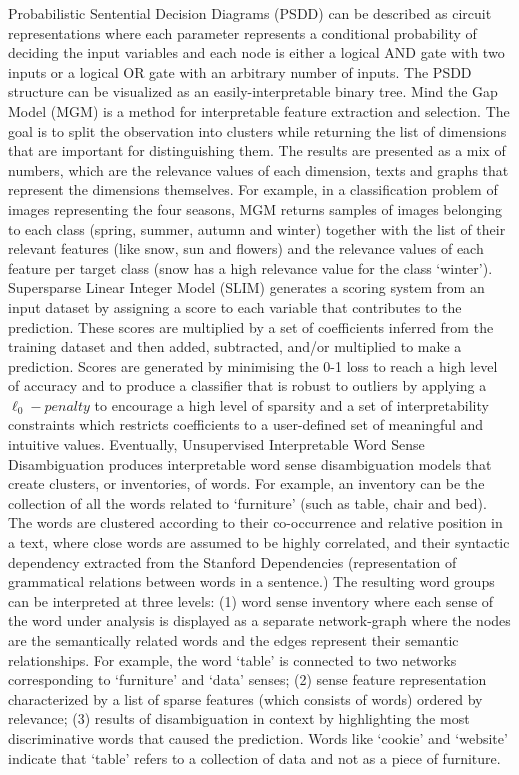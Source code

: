 \documentclass[final,1p,times]{elsarticle}
\begin{document}
Probabilistic Sentential Decision Diagrams (PSDD) \cite{liang2017towards} can be described as circuit representations where each parameter represents a conditional probability of deciding the input variables and each node is either a logical AND gate with two inputs or a logical OR gate with an arbitrary number of inputs. The PSDD structure can be visualized as an easily-interpretable binary tree.
Mind the Gap Model (MGM) \cite{kim2015mind} is a method for interpretable feature extraction and selection. The goal is to split the observation into clusters while returning the list of dimensions that are important for distinguishing them. The results are presented as a mix of numbers, which are the relevance values of each dimension, texts and graphs that represent the dimensions themselves. For example, in a classification problem of images representing the four seasons, MGM returns samples of images belonging to each class (spring, summer, autumn and winter) together with the list of their relevant features (like snow, sun and flowers) and the relevance values of each feature per target class (snow has a high relevance value for the class `winter').
Supersparse Linear Integer Model (SLIM) \cite{ustun2014supersparse} generates a scoring system from an input dataset by assigning a score to each variable that contributes to the prediction. These scores are multiplied by a set of coefficients inferred from the training dataset and then added, subtracted, and/or multiplied to make a prediction. Scores are generated by minimising the 0-1 loss to reach a high level of accuracy and to produce a classifier that is robust to outliers by applying a $\ell_0-penalty$ to encourage a high level of sparsity and a set of interpretability constraints which restricts coefficients to a user-defined set of meaningful and intuitive values.
Eventually, Unsupervised Interpretable Word Sense Disambiguation \cite{panchenko2017unsupervised} produces interpretable word sense disambiguation models that create clusters, or inventories, of words. For example, an inventory can be the collection of all the words related to `furniture' (such as table, chair and bed). The words are clustered according to their co-occurrence and relative position in a text, where close words are assumed to be highly correlated, and their syntactic dependency extracted from the Stanford Dependencies (representation of grammatical relations between words in a sentence.)
The resulting word groups can be interpreted at three levels: (1) word sense inventory where each sense of the word under analysis is displayed as a separate network-graph where the nodes are the semantically related words and the edges represent their semantic relationships. For example, the word `table' is connected to two networks corresponding to `furniture' and `data' senses; (2) sense feature representation characterized by a list of sparse features (which consists of words) ordered by relevance; (3) results of disambiguation in context by highlighting the most discriminative words that caused the prediction. Words like `cookie' and `website' indicate that `table' refers to a collection of data and not as a piece of furniture.\\
\end{document}
